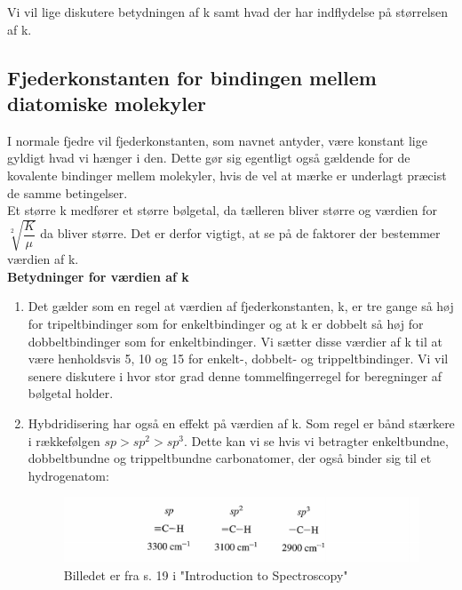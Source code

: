 Vi vil lige diskutere betydningen af k samt hvad der har indflydelse på størrelsen af k. 
\subsection{Fjederkonstanten for bindingen mellem diatomiske molekyler}

I normale fjedre vil fjederkonstanten, som navnet antyder, være konstant lige gyldigt hvad vi hænger i den. Dette gør sig egentligt også gældende for de kovalente bindinger mellem molekyler, hvis de vel at mærke er underlagt præcist de samme betingelser. 
\\

Et større k medfører et større bølgetal, da tælleren bliver større og værdien for $\sqrt[2]{\dfrac{K}{\mu}}$ da bliver større. Det er derfor vigtigt, at se på de faktorer der bestemmer værdien af k.
\\

\textbf{Betydninger for værdien af k}
\begin{enumerate}
\item Det gælder som en regel at værdien af fjederkonstanten, k, er tre gange så høj for tripeltbindinger som for enkeltbindinger og at k er dobbelt så høj for dobbeltbindinger som for enkeltbindinger. Vi sætter disse værdier af k til at være henholdsvis 5, 10 og 15 for enkelt-, dobbelt- og trippeltbindinger. Vi vil senere diskutere i hvor stor grad denne tommelfingerregel for beregninger af bølgetal holder.

\item Hybdridisering har også en effekt på værdien af k. Som regel er bånd stærkere i rækkefølgen $sp > sp^2 > sp^3$. Dette kan vi se hvis vi betragter enkeltbundne, dobbeltbundne og trippeltbundne carbonatomer, der også binder sig til et hydrogenatom:

\begin{center}
\begin{figure}
\includegraphics[scale=1]{Billeder/sp}
\caption{Billedet er fra s. 19 i "Introduction to Spectroscopy"}
\end{figure}
\end{center}


\end{enumerate}

